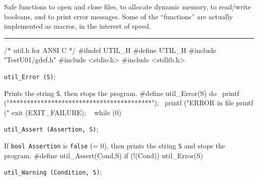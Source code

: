 
Safe functions to open and close files, to allocate dynamic memory,
to read/write booleans, and to print error messages.
Some of the ``functions'' are actually implemented as macros, in the
interest of speed.

\bigskip\hrule
\code\hide
/* util.h  for ANSI C */
#ifndef UTIL_H
#define UTIL_H
\endhide
#include "TestU01/gdef.h"
#include <stdio.h>
#include <stdlib.h>
\endcode





\noindent
{\tt util\_Error (S)};

 \tab  Prints the string {\tt S}, then stops the program.
 \endtab
\code
\hide
#define util_Error(S) do { \
   printf ("\n\n******************************************\n"); \
   printf ("ERROR in file %
   printf ("%
   exit (EXIT_FAILURE); \
   } while (0)
\endhide
\endcode

\noindent
{\tt util\_Assert (Assertion, S)};

 \tab  If {\tt bool Assertion} is {\tt false} (= 0),
  then prints the string {\tt S} and stops the program.
 \endtab
\code
\hide
#define util_Assert(Cond,S) if (!(Cond)) util_Error(S)
\endhide
\endcode

\noindent
{\tt util\_Warning (Condition, S)};

